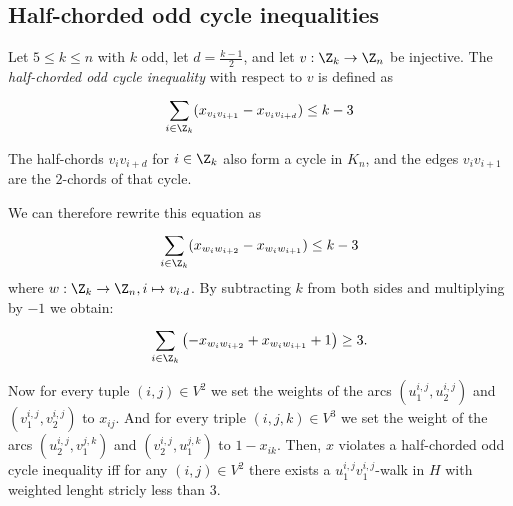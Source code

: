 \subsection{Half-chorded odd cycle inequalities}

\begin{definition}\label{def:half-chorded}
Let $5 \leq k \leq n$ with $k$ odd, let $d = \frac{k-1}{2}$, and let $v: \Z_{k} \to \Z_{n}$ be injective.
The \textit{half-chorded odd cycle inequality} with respect to $v$ is defined as
\begin{equation}\label{eq:half-chorded}
	\sum_{i \in \Z_{k}}^{} (x_{v_{i} v_{i+1}} - x_{v_{i} v_{i+d} }) \leq k - 3
\end{equation}
\end{definition}
\begin{note}
	The half-chords $v_{i}v_{i+d}$ for $i \in \Z_{k}$ also form a cycle in $K_{n}$, and the edges $v_{i}v_{i+1}$ are the $2$-chords of that cycle.
\end{note}
We can therefore rewrite this equation as
\begin{equation*}
\sum_{i \in \Z_{k}}^{} (x_{w_{i}w_{i+2}} - x_{w_{i}w_{i+1}}) \leq k-3
\end{equation*}
where $w: \Z_{k} \to \Z_{n}, i \mapsto v_{i \cdot d}$.
By subtracting $k$ from both sides and multiplying by $-1$ we obtain:
\begin{equation*}
	\sum_{i \in \Z_{k}}^{} \left( -x_{w_{i}w_{i+2}} + x_{w_{i}w_{i+1}} + 1 \right) \geq 3.
\end{equation*}

Now for every tuple $(i,j) \in V^{2}$ we set the weights of the arcs $(u_{1}^{i,j}, u_{2}^{i,j})$ and $(v_{1}^{i,j}, v_{2}^{i,j})$ to $x_{ij}$.
And for every triple $(i,j,k) \in V^{3}$ we set the weight of the arcs $(u_{2}^{i,j}, v_{1}^{j,k})$ and $(v_{2}^{i,j}, u_{1}^{j,k})$ to $1-x_{ik}$.
Then, $x$ violates a half-chorded odd cycle inequality iff for any $(i,j) \in V^{2}$ there exists a $u_{1}^{i,j}v_{1}^{i,j}$-walk in $H$ with weighted lenght stricly less than 3.
